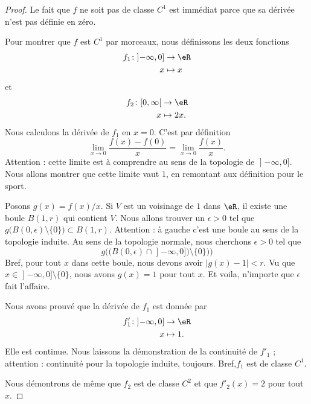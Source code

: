 \begin{proof}
	Le fait que \( f\) ne soit pas de classe \( C^1\) est immédiat parce que sa dérivée n'est pas définie en zéro.

	Pour montrer que \( f\) est \( C^1\) par morceaux, nous définissons les deux fonctions
	\begin{equation}
		\begin{aligned}
			f_1\colon \mathopen] -\infty,0\mathclose] & \to \eR   \\
			x                                         & \mapsto x
		\end{aligned}
	\end{equation}
	et
	\begin{equation}
		\begin{aligned}
			f_2\colon \mathopen[ 0,\infty\mathclose[ & \to \eR     \\
			x                                        & \mapsto 2x.
		\end{aligned}
	\end{equation}
	Nous calculons la dérivée de \( f_1\) en \( x=0\). C'est par définition
	\begin{equation}
		\lim_{x\to 0} \frac{ f(x)-f(0) }{ x }=\lim_{x\to 0} \frac{ f(x) }{ x }.
	\end{equation}
	Attention : cette limite est à comprendre au sens de la topologie de \( \mathopen] -\infty,0\mathclose]\). Nous allons montrer que cette limite vaut \( 1\), en remontant aux définition pour le sport.

	Posons \( g(x)=f(x)/x\). Si \( V\) est un voisinage de \( 1\) dans \( \eR\), il existe une boule \( B(1,r)\) qui contient \( V\). Nous allons trouver un \( \epsilon>0\) tel que \( g\big( B(0,\epsilon)\setminus \{ 0 \} \big)\subset B(1,r)\). Attention : à gauche c'est une boule au sens de la topologie induite. Au sens de la topologie normale, nous cherchons \( \epsilon>0\) tel que
	\begin{equation}
		g\Big(\big( B(0,\epsilon)\cap\mathopen] -\infty,0\mathclose] \big)\setminus\{ 0 \})\Big)
	\end{equation}
	Bref, pour tout \( x\) dans cette boule, nous devons avoir \(  | g(x)-1 |<r  \). Vu que \( x\in\mathopen] -\infty,0\mathclose]\setminus\{ 0 \}\), nous avons \( g(x)=1\) pour tout \( x\). Et voila, n'importe que \( \epsilon\) fait l'affaire.

	Nous avons prouvé que la dérivée de \( f_1\) est donnée par
	\begin{equation}
		\begin{aligned}
			f_1'\colon \mathopen] -\infty,0\mathclose] & \to \eR    \\
			x                                          & \mapsto 1.
		\end{aligned}
	\end{equation}
	Elle est continue. Nous laissons la démonstration de la continuité de \( f'_1\) ; attention : continuité pour la topologie induite, toujours. Bref,\( f_1\) est de classe \( C^1\).

	Nous démontrons de même que \( f_2\) est de classe \( C^2\) et que \( f'_2(x)=2\) pour tout \( x\).
\end{proof}

